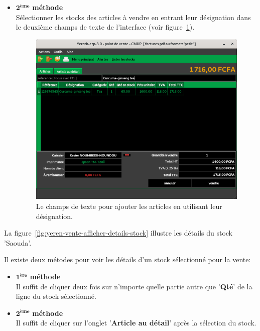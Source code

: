 \begin{itemize}[]
	\newpage
	\item \textcolor{purplish}{$\mathbf{2^{\text{\`eme}}}$ \textbf{m\'ethode}}\\
	S\'electionner les stocks des articles \`a vendre
	en entrant leur d\'esignation dans le deuxi\`eme
	champs de texte de l'interface
	(voir figure~\ref{fig:yeren-vendre-choisir-stock-designation}).
	\begin{figure}[!htbp]
		\centering
		\includegraphics[scale=0.63]{images/yeren-vendre-choisir-stock-designation.png}
		\caption{Le champs de texte pour
			ajouter les articles en utilisant leur d\'esignation.}\label{fig:yeren-vendre-choisir-stock-designation}
	\end{figure}
\end{itemize}

\newpage



La figure~\ref{fig:yeren-vente-afficher-details-stock}
illustre les d\'etails du stock 'Saouda'.

Il existe deux m\'etodes pour voir les d\'etails
d'un stock s\'electionn\'e pour la vente:
\begin{itemize}[]
	\item \textcolor{purplish}{$\mathbf{1^{\text{\`ere}}}$ \textbf{m\'ethode}}\\
	Il suffit de cliquer deux fois sur n'importe quelle
	partie autre que '\textbf{Qt\'e}' de la ligne du
	stock s\'electionn\'e.\\
	
	\item \textcolor{purplish}{$\mathbf{2^{\text{\`eme}}}$ \textbf{m\'ethode}}\\
	Il suffit de cliquer sur l'onglet '\textbf{Article au d\'etail}'
	apr\`es la s\'election du stock.
\end{itemize}

